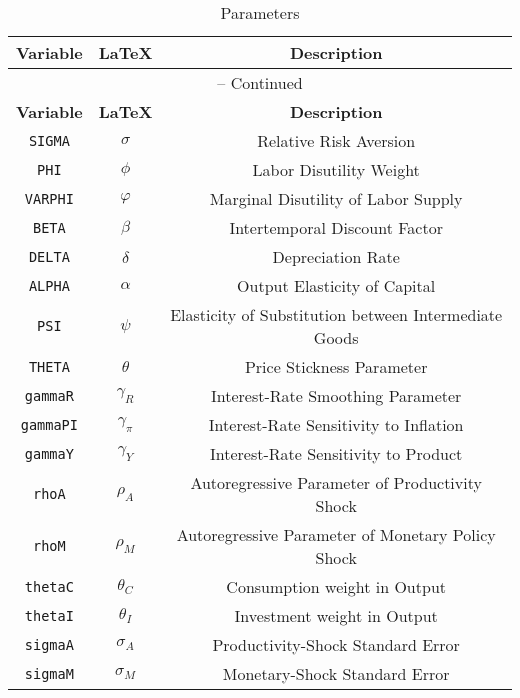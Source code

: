 \begin{center}
\begin{longtable}{ccc}
\caption{Parameters}\\%
\hline%
\multicolumn{1}{c}{\textbf{Variable}} &
\multicolumn{1}{c}{\textbf{\LaTeX}} &
\multicolumn{1}{c}{\textbf{Description}}\\%
\hline\hline%
\endfirsthead
\multicolumn{3}{c}{{\tablename} \thetable{} -- Continued}\\%
\hline%
\multicolumn{1}{c}{\textbf{Variable}} &
\multicolumn{1}{c}{\textbf{\LaTeX}} &
\multicolumn{1}{c}{\textbf{Description}}\\%
\hline\hline%
\endhead
\texttt{SIGMA} & ${\sigma}$ & Relative Risk Aversion\\
\texttt{PHI} & ${\phi}$ & Labor Disutility Weight\\
\texttt{VARPHI} & ${\varphi}$ & Marginal Disutility of Labor Supply\\
\texttt{BETA} & ${\beta}$ & Intertemporal Discount Factor\\
\texttt{DELTA} & ${\delta}$ & Depreciation Rate\\
\texttt{ALPHA} & ${\alpha}$ & Output Elasticity of Capital\\
\texttt{PSI} & ${\psi}$ & Elasticity of Substitution between Intermediate Goods\\
\texttt{THETA} & ${\theta}$ & Price Stickness Parameter\\
\texttt{gammaR} & ${\gamma_R}$ & Interest-Rate Smoothing Parameter\\
\texttt{gammaPI} & ${\gamma_\pi}$ & Interest-Rate Sensitivity to Inflation\\
\texttt{gammaY} & ${\gamma_Y}$ & Interest-Rate Sensitivity to Product\\
\texttt{rhoA} & ${\rho_A}$ & Autoregressive Parameter of Productivity Shock\\
\texttt{rhoM} & ${\rho_M}$ & Autoregressive Parameter of Monetary Policy Shock\\
\texttt{thetaC} & ${\theta_C}$ & Consumption weight in Output\\
\texttt{thetaI} & ${\theta_I}$ & Investment weight in Output\\
\texttt{sigmaA} & ${\sigma_A}$ & Productivity-Shock Standard Error\\
\texttt{sigmaM} & ${\sigma_M}$ & Monetary-Shock Standard Error\\
\hline%
\end{longtable}
\end{center}

